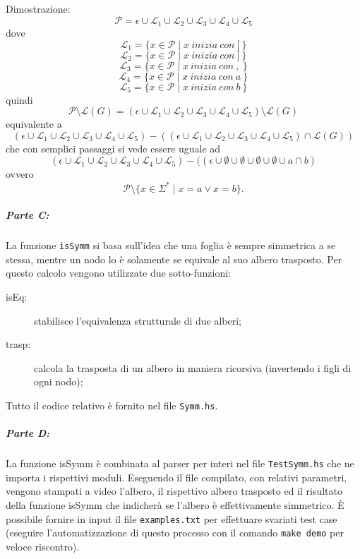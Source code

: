 \documentclass[a4paper, oneside, 11pt]{article}
\begin{document}
Dimostrazione:
\\
\[\mathcal{P}= \epsilon \cup \mathcal{L}_{1} \cup \mathcal{L}_{2} \cup \mathcal{L}_{3} \cup \mathcal{L}_{4} \cup \mathcal{L}_{5}\]
dove
\[\mathcal{L}_{1} = \{ x \in \mathcal{P} \mid x\ inizia\ con\ {[}\ \} \]
\[\mathcal{L}_{2} = \{ x \in \mathcal{P} \mid x\ inizia\ con\ {]}\ \} \]
\[\mathcal{L}_{3} = \{ x \in \mathcal{P} \mid x\ inizia\ con\ {,}\ \} \]
\[\mathcal{L}_{4} = \{ x \in \mathcal{P} \mid x\ inizia\ con\ {a}\ \} \]
\[\mathcal{L}_{5} = \{ x \in \mathcal{P} \mid x\ inizia\ con\ {b}\ \} \]
quindi
\[\mathcal{P}\setminus\mathcal{L}(G) = (\epsilon \cup \mathcal{L}_{1} \cup \mathcal{L}_{2} \cup \mathcal{L}_{3} \cup \mathcal{L}_{4} \cup \mathcal{L}_{5} )\setminus \mathcal{L}(G) \]
equivalente a
\[(\epsilon \cup \mathcal{L}_{1} \cup \mathcal{L}_{2} \cup \mathcal{L}_{3} \cup \mathcal{L}_{4} \cup \mathcal{L}_{5} )- %
( (\epsilon \cup \mathcal{L}_{1} \cup \mathcal{L}_{2} \cup \mathcal{L}_{3} \cup \mathcal{L}_{4} \cup \mathcal{L}_{5} )\cap \mathcal{L}(G) ) \]
che con semplici passaggi si vede essere uguale ad
\[(\epsilon \cup \mathcal{L}_{1} \cup \mathcal{L}_{2} \cup \mathcal{L}_{3} \cup \mathcal{L}_{4} \cup \mathcal{L}_{5} ) - ( (\epsilon \cup \emptyset \cup \emptyset  \cup \emptyset \cup \emptyset \cup {a} \cap {b} ) \]
ovvero
\[\mathcal{P}\setminus\{x\in\Sigma^{\ast}\mid x=a \vee x=b\}.\]

\subparagraph*{Parte C:}
La funzione \texttt{isSymm} si basa sull'idea che una foglia \`e sempre simmetrica a se stessa, mentre un nodo lo \`e solamente se equivale al suo albero trasposto. Per questo calcolo vengono utilizzate due sotto-funzioni:
\begin{description}
  \item[isEq:] stabilisce l'equivalenza strutturale di due alberi;
  \item[trasp:] calcola la trasposta di un albero in maniera ricorsiva (invertendo i figli di ogni nodo);
\end{description}
\par
Tutto il codice relativo \`e fornito nel file \texttt{Symm.hs}.
\par
\subparagraph*{Parte D:}
La funzione isSymm \`e combinata al parser per interi nel file \texttt{TestSymm.hs} che ne importa i rispettivi moduli. Eseguendo il file compilato, con relativi parametri, vengono stampati a video l'albero, il rispettivo albero trasposto ed il risultato della funzione isSymm che indicher\`a se l'albero \`e effettivamente simmetrico.
\`E possibile fornire in input il file \texttt{examples.txt} per effettuare svariati test case (eseguire l'automatizzazione di questo processo con il comando \texttt{make demo} per veloce riscontro).
\end{document}
